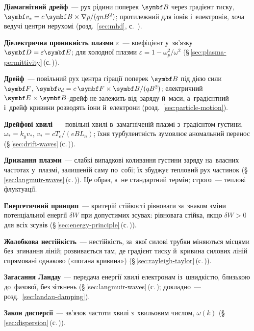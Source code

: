 	\item \textbf{Діамагнітний дрейф}~--- рух рідини поперек $\vect B$ через градієнт тиску, $\vect v_*=c\,\vect B\times\nabla p/(qnB^2)$; протилежний для іонів і~електронів, хоча ведучі центри нерухомі (розд.~\ref{sec:mhd}, с.~\pageref{sec:mhd}).
	\item \textbf{Діелектрична проникність плазми} $\varepsilon$~--- коефіцієнт у~зв'язку $\vect D=\varepsilon\vect E$;
	  для холодної плазми $\varepsilon=1-\omega_p^2/\omega^2$ (§\,\ref{sec:plasma-permittivity}\,(с.\,\pageref{sec:plasma-permittivity})).
	\item \textbf{Дрейф}~--- повільний рух центра гірації поперек $\vect B$ під дією сили $\vect F$, $\vect v_d=c\,\vect F\times\vect B/(qB^2)$; електричний $\vect E\times\vect B$-дрейф не залежить від~заряду й~маси, а~градієнтний і~дрейф кривини розводять іони й~електрони (розд.~\ref{sec:particle-motion}).
	\item \textbf{Дрейфові хвилі}~--- повільні хвилі в~замагніченій плазмі з~градієнтом густини, $\omega_*=k_yv_*$, $v_*=cT_e/(eBL_n)$; їхня турбулентність зумовлює аномальний перенос (§\,\ref{sec:drift-waves}\,(с.\,\pageref{sec:drift-waves})).
	\item \textbf{Дрижання плазми}~--- слабкі випадкові коливання густини заряду на~власних частотах у~плазмі,
	  залишеній саму по~собі; їх збуджує тепловий рух частинок (§\,\ref{sec:langmuir-waves}\,(с.\,\pageref{sec:langmuir-waves})). Це образ, а~не
	  стандартний термін; строго~--- теплові флуктуації.
	\item \textbf{Енергетичний принцип}~--- критерій стійкості рівноваги за~знаком зміни потенціальної енергії $\delta W$ при допустимих зсувах: рівновага стійка, якщо $\delta W>0$ для всіх зсувів (§\,\ref{sec:energy-principle}\,(с.\,\pageref{sec:energy-principle})).
	\item \textbf{Жолобкова нестійкість}~--- нестійкість, за~якої силові трубки міняються місцями без~згинання ліній; розвивається там, де градієнт тиску й~кривина силових ліній спрямовані однаково («погана кривина») (§\,\ref{sec:rayleigh-taylor}\,(с.\,\pageref{sec:rayleigh-taylor})).
	\item \textbf{Загасання Ландау}~--- передача енергії хвилі електронам із~швидкістю, близькою до~фазової,
	  без зіткнень (§\,\ref{sec:langmuir-waves}\,(с.\,\pageref{sec:langmuir-waves}); докладно~--- розд.~\ref{sec:landau-damping}).
	\item \textbf{Закон дисперсії}~--- зв'язок частоти хвилі з~хвильовим числом, $\omega(k)$ (§\,\ref{sec:dispersion}\,(с.\,\pageref{sec:dispersion})).
